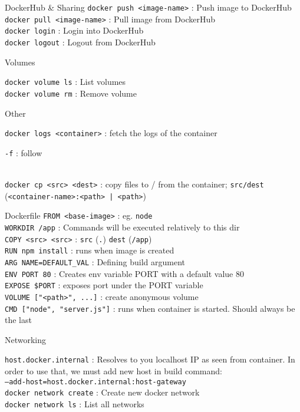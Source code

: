 \documentclass[10pt]{article}
\newcommand{\code}[1]{{\color{teal}\texttt{#1}}}
\newcommand{\cmd}[3][.3]{\code{#2} : #3 \\[#1em]}
\newcommand{\opts}[2][.5]{\hspace*{.5cm}\begin{minipage}{0.9\textwidth}
  #2
  \vspace*{-1em}
\end{minipage}\\[#1em]}
\newcommand{\cluster}[2]{\begin{mybox}{#1}
  #2
  \vspace*{-1.3em}
\end{mybox}}
\begin{document}
\begin{multicols*}{2}
  \begin{mybox}{DockerHub \& Sharing}
    \cmd{docker push <image-name>}{Push image to DockerHub}
    \cmd{docker pull <image-name>}{Pull image from DockerHub}
    \cmd{docker login}{Login into DockerHub}
    \cmd{docker logout}{Logout from DockerHub}
    \vspace*{-1.3em}
  \end{mybox}

  \cluster{Volumes}{
    \cmd{docker volume ls}{List volumes}
    \cmd{docker volume rm}{Remove volume}
  }

  \cluster{Other}{
    \cmd{docker logs <container>}{fetch the logs of the container}
    \opts{
      \code{-f} : follow \\
    }
    \cmd{docker cp <src> <dest>}{copy files to / from the container; \code{src/dest} (\code{<container-name>:<path> | <path>})}
  }

  \begin{mybox}{Dockerfile}
    \code{FROM <base-image>} : eg. \code{node}  \\[.3em]
    \code{WORKDIR /app} : Commands will be executed relatively to this dir \\[.3em]
    \code{COPY <src> <src>} : \code{src} (\code{.}) \code{dest} (\code{/app}) \\[.3em]
    \code{RUN npm install} : runs when image is created \\[.3em]
    \cmd{ARG NAME=DEFAULT\_VAL}{Defining build argument}
    \code{ENV PORT 80} : Creates env variable PORT with a default value 80 \\[.3em]
    \code{EXPOSE \$PORT} : exposes port under the PORT variable \\[.3em]
    \code{VOLUME ["<path>", ...]} : create anonymous volume \\[.3em]
    \code{CMD ["node", "server.js"]} : runs when container is started. Should always be the last \\[.3em]
    \vspace*{-1.3em}
  \end{mybox}

  \cluster{Networking}{
    \cmd{host.docker.internal}{Resolves to you localhost IP as seen from container. In order to use that, we must add new host in build command: \\\code{---add-host=host.docker.internal:host-gateway}}
    \cmd{docker network create}{Create new docker network}
    \cmd{docker network ls}{List all networks}
  }


\end{multicols*}
\end{document}
